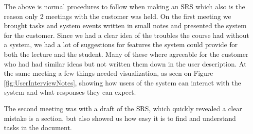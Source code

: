 \documentclass[Main]{subfiles}
\begin{document}
The above is normal procedures to follow when making an SRS which also is the reason only 2 meetings with the customer was held.
On the first meeting we brought tasks and system events written in small notes and presented the system for the customer.
Since we had a clear idea of the troubles the course had without a system, we had a lot of suggestions for features the system could provide for both the lecture and the student.
Many of these where agreeable for the customer who had had similar ideas but not written them down in the user description. 
At the same meeting a few things needed visualization, as seen on Figure \ref{fig:UserInterviewNotes}, showing how users of the system can interact with the system and what responses they can expect.

The second meeting was with a draft of the SRS, which quickly revealed a clear mistake is a section, but also showed us how easy it is to find and understand tasks in the document.
\end{document}
